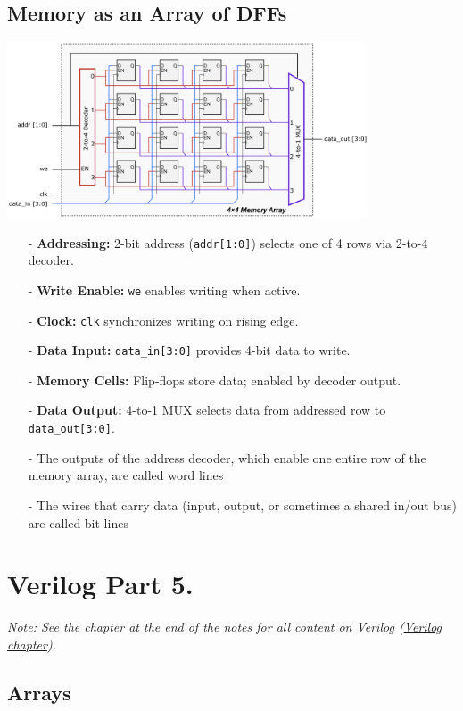 \documentclass[12pt,openany]{book}
\begin{document}
\subsection{Memory as an Array of DFFs }
\begin{center}
	\includegraphics[width=0.8\textwidth]{circuits/16.2.6.png}
\end{center}
\begin{itemize}
    \item[-] \textbf{Addressing:} 2-bit address (\texttt{addr[1:0]}) selects one of 4 rows via 2-to-4 decoder.
    \item[-] \textbf{Write Enable:} \texttt{we} enables writing when active.
    \item[-] \textbf{Clock:} \texttt{clk} synchronizes writing on rising edge.
    \item[-] \textbf{Data Input:} \texttt{data\_in[3:0]} provides 4-bit data to write.
    \item[-] \textbf{Memory Cells:} Flip-flops store data; enabled by decoder output.
    \item[-] \textbf{Data Output:} 4-to-1 MUX selects data from addressed row to \texttt{data\_out[3:0]}.
\end{itemize}
\begin{itemize}
	\item[-] The outputs of the address decoder, which enable one entire row of the memory array, are called word lines
	\item[-]The wires that carry data (input, output, or sometimes a shared in/out bus) are called bit lines
\end{itemize}
\section{Verilog Part 5.}
 \textit{Note: See the chapter at the end of the notes for all content on Verilog (\hyperref[Verilog]{Verilog chapter}).}

\subsection{Arrays}
\end{document}
